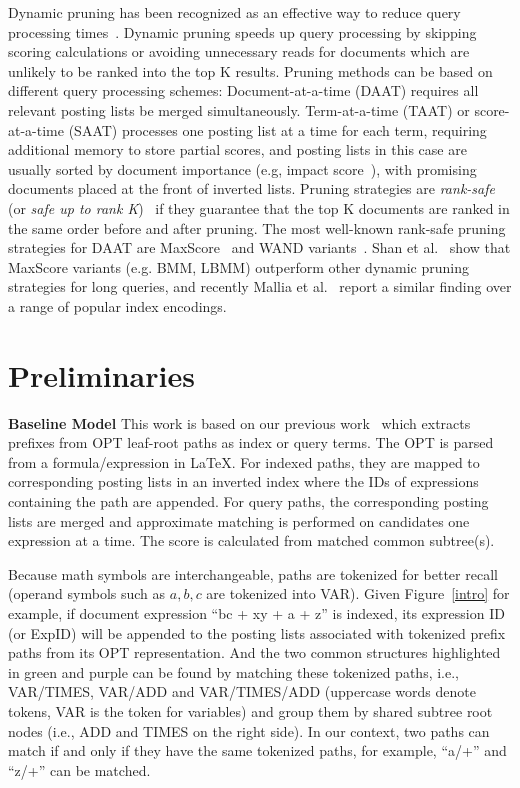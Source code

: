 \documentclass[runningheads]{llncs}
\begin{document}
Dynamic pruning has been recognized as an effective way to reduce query processing times~\cite{jonassen_simon_2011, antonio2019, macdonald2011upper, tonellotto2018efficient}.
%
Dynamic pruning speeds up query processing by skipping scoring calculations or avoiding unnecessary reads for documents which are unlikely to be ranked into the top K results.
%
Pruning methods can be based on different query processing schemes:
Document-at-a-time (DAAT) requires all relevant posting lists be merged simultaneously. Term-at-a-time (TAAT) or score-at-a-time (SAAT) processes one posting list at a time for each term, requiring additional memory to store partial scores, and posting lists in this case are usually sorted by document importance (e.g, impact score~\cite{anh2006SAAT}), with promising documents placed at  the front of inverted lists.
%
Pruning strategies are \textit{rank-safe} (or \textit{safe up to rank K})~\cite{turtle_flood_1995} if they guarantee that the top K documents are ranked in the same order before and after pruning. 
%
The most well-known rank-safe pruning strategies for DAAT are MaxScore~\cite{turtle_flood_1995, strohman_turtle_2005, jonassen_simon_2011} and WAND variants~\cite{broder2003WAND, ding2011BMW}.
%
Shan et al.~\cite{Shandongdong2012} show that MaxScore variants (e.g. BMM, LBMM) outperform other dynamic pruning strategies for long queries, and recently Mallia et al.~\cite{antonio2019} report a similar finding over a range of popular index encodings.


\section{Preliminaries}
\noindent\textbf{Baseline Model}\; This work is based on our previous work~\cite{a0_2019} which extracts prefixes from OPT leaf-root paths as index or query terms. The OPT is parsed from a formula/expression in \LaTeX{}. For indexed paths, they are mapped to corresponding posting lists in an inverted index where the IDs of expressions containing the path are appended.
For query paths, the corresponding posting lists are merged and approximate matching is performed on candidates one expression at a time. The score is calculated from matched common subtree(s).

Because math symbols are interchangeable, paths are tokenized for better recall (operand symbols such as $a, b, c$ are tokenized into VAR).
Given Figure~\ref{intro} for example, if document expression ``bc + xy + a + z'' is indexed, its expression ID (or ExpID) will be appended to the posting lists associated with tokenized prefix paths from its OPT representation.
And the two common structures highlighted in green and purple can be found by matching these tokenized paths, i.e.,  VAR/TIMES, VAR/ADD and VAR/TIMES/ADD (uppercase words denote tokens, VAR is the token for variables) and group them by shared subtree root nodes (i.e., ADD and TIMES on the right side).
%
In our context, two paths can match if and only if they have the same tokenized paths,
for example, ``a/+'' and ``z/+'' can be matched.
\end{document}
